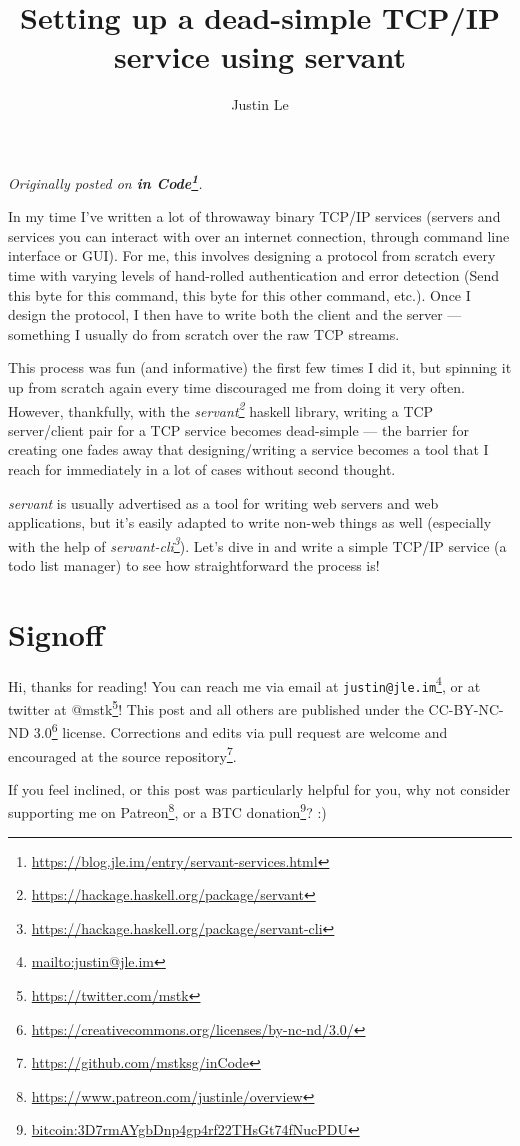 \documentclass[]{article}
\title{Setting up a dead-simple TCP/IP service using servant}
\author{Justin Le}
\renewcommand{\href}[2]{#2\footnote{\url{#1}}}
\begin{document}
\maketitle

\emph{Originally posted on
\textbf{\href{https://blog.jle.im/entry/servant-services.html}{in Code}}.}

In my time I've written a lot of throwaway binary TCP/IP services (servers and
services you can interact with over an internet connection, through command line
interface or GUI). For me, this involves designing a protocol from scratch every
time with varying levels of hand-rolled authentication and error detection (Send
this byte for this command, this byte for this other command, etc.). Once I
design the protocol, I then have to write both the client and the server ---
something I usually do from scratch over the raw TCP streams.

This process was fun (and informative) the first few times I did it, but
spinning it up from scratch again every time discouraged me from doing it very
often. However, thankfully, with the
\emph{\href{https://hackage.haskell.org/package/servant}{servant}} haskell
library, writing a TCP server/client pair for a TCP service becomes dead-simple
--- the barrier for creating one fades away that designing/writing a service
becomes a tool that I reach for immediately in a lot of cases without second
thought.

\emph{servant} is usually advertised as a tool for writing web servers and web
applications, but it's easily adapted to write non-web things as well
(especially with the help of
\emph{\href{https://hackage.haskell.org/package/servant-cli}{servant-cli}}).
Let's dive in and write a simple TCP/IP service (a todo list manager) to see how
straightforward the process is!

\hypertarget{signoff}{%
\section{Signoff}\label{signoff}}

Hi, thanks for reading! You can reach me via email at
\href{mailto:justin@jle.im}{\nolinkurl{justin@jle.im}}, or at twitter at
\href{https://twitter.com/mstk}{@mstk}! This post and all others are published
under the \href{https://creativecommons.org/licenses/by-nc-nd/3.0/}{CC-BY-NC-ND
3.0} license. Corrections and edits via pull request are welcome and encouraged
at \href{https://github.com/mstksg/inCode}{the source repository}.

If you feel inclined, or this post was particularly helpful for you, why not
consider \href{https://www.patreon.com/justinle/overview}{supporting me on
Patreon}, or a \href{bitcoin:3D7rmAYgbDnp4gp4rf22THsGt74fNucPDU}{BTC donation}?
:)
\end{document}
